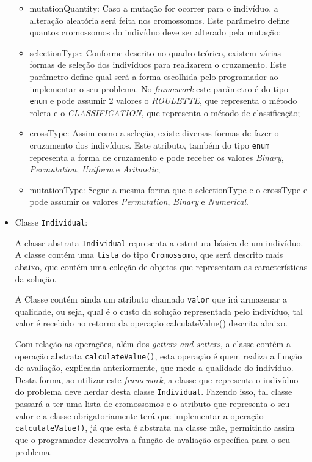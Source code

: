 \begin{itemize}
\begin{itemize}
		\item{mutationQuantity}:
		Caso a mutação for ocorrer para o indivíduo, a alteração aleatória será feita nos cromossomos. 
		Este parâmetro define quantos cromossomos do indivíduo deve ser alterado pela mutação;
		
		\item{selectionType}:
		Conforme descrito no quadro teórico, existem várias formas de seleção dos indivíduos para realizarem 
		o cruzamento. Este parâmetro define qual será a forma escolhida pelo programador ao implementar o seu problema. 
		No \textit{framework} este parâmetro é do tipo \texttt{enum} e pode assumir 2 valores o \textit{ROULETTE}, 
		que representa o método roleta e o \textit{CLASSIFICATION}, que representa o método de classificação;
		
		\item{crossType}:
		Assim como a seleção, existe diversas formas de fazer o cruzamento dos indivíduos. Este atributo, 
		também do tipo \texttt{enum} representa a forma de cruzamento e pode receber os valores \textit{Binary}, 
		\textit{Permutation}, \textit{Uniform} e \textit{Aritmetic};
		
		\item{mutationType}:
		Segue a mesma forma que o selectionType e o crossType e pode assumir os valores \textit{Permutation}, 
		\textit{Binary} e \textit{Numerical}.
		
	\end{itemize}
	
	\item Classe \texttt{Individual}:
	\par A classe abstrata \texttt{Individual} representa a estrutura básica de um indivíduo. A classe contém uma \texttt{lista} do tipo 
	\texttt{Cromossomo}, que será descrito mais abaixo, que contém uma coleção de objetos que representam as 
	características da solução.
	
	\par A Classe contém ainda um atributo chamado \texttt{valor} que irá armazenar a qualidade, ou seja, qual é o custo
	da solução representada pelo indivíduo, tal valor é recebido no retorno da operação calculateValue() descrita abaixo.
	
	\par Com relação as operações, além dos \textit{getters and setters}, a classe contém a operação abstrata 
	\texttt{calculateValue()}, esta operação é quem realiza a função de avaliação, explicada anteriormente, que mede 
	a qualidade do indivíduo. Desta forma, ao utilizar este \textit{framework}, a classe que representa o indivíduo do 
	problema deve herdar desta classe  \texttt{Individual}. Fazendo isso, tal classe passará a ter uma lista de cromossomos 
	e o atributo que representa o seu valor e a classe obrigatoriamente terá que implementar a operação 
	\texttt{calculateValue()}, já que esta é abstrata na classe mãe, permitindo assim que o programador 
	desenvolva a função de avaliação específica para o seu problema.
	

\end{itemize}
